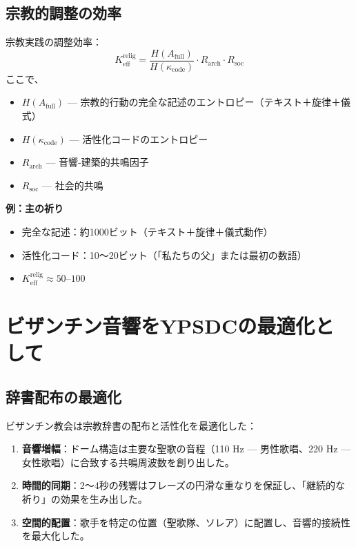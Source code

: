 \documentclass[12pt,a4paper]{article}
\begin{document}
	\subsection{宗教的調整の効率}
	
	宗教実践の調整効率：
	\[
	K_{\mathrm{eff}}^{\mathrm{relig}} = \frac{H(A_{\mathrm{full}})}{H(\kappa_{\mathrm{code}})} \cdot R_{\mathrm{arch}} \cdot R_{\mathrm{soc}}
	\]
	ここで、
	\begin{itemize}
		\item $H(A_{\mathrm{full}})$ — 宗教的行動の完全な記述のエントロピー（テキスト＋旋律＋儀式）
		\item $H(\kappa_{\mathrm{code}})$ — 活性化コードのエントロピー
		\item $R_{\mathrm{arch}}$ — 音響‐建築的共鳴因子
		\item $R_{\mathrm{soc}}$ — 社会的共鳴
	\end{itemize}
	
	\textbf{例：主の祈り}
	\begin{itemize}
		\item 完全な記述：約1000ビット（テキスト＋旋律＋儀式動作）
		\item 活性化コード：10〜20ビット（「私たちの父」または最初の数語）
		\item $K_{\mathrm{eff}}^{\mathrm{relig}} \approx 50$–$100$
	\end{itemize}
	
	\section{ビザンチン音響をYPSDCの最適化として}
	
	\subsection{辞書配布の最適化}
	
	ビザンチン教会は宗教辞書の配布と活性化を最適化した：
	
	\begin{enumerate}
		\item \textbf{音響増幅}：ドーム構造は主要な聖歌の音程（110 Hz — 男性歌唱、220 Hz — 女性歌唱）に合致する共鳴周波数を創り出した。
		\item \textbf{時間的同期}：2〜4秒の残響はフレーズの円滑な重なりを保証し、「継続的な祈り」の効果を生み出した。
		\item \textbf{空間的配置}：歌手を特定の位置（聖歌隊、ソレア）に配置し、音響的接続性を最大化した。
	\end{enumerate}
	
\end{document}
